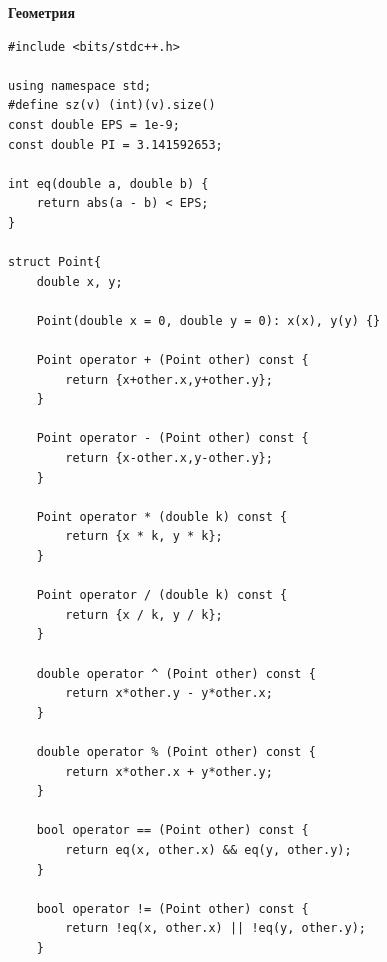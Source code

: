 \documentclass[a4paper, 10pt]{article}
\begin{document}
{\Large \textbf{Геометрия}}
\begin{lstlisting}
#include <bits/stdc++.h>

using namespace std;
#define sz(v) (int)(v).size()
const double EPS = 1e-9;
const double PI = 3.141592653;

int eq(double a, double b) {
    return abs(a - b) < EPS;
}

struct Point{
    double x, y;

    Point(double x = 0, double y = 0): x(x), y(y) {}

    Point operator + (Point other) const {
        return {x+other.x,y+other.y};
    }

    Point operator - (Point other) const {
        return {x-other.x,y-other.y};
    }

    Point operator * (double k) const {
        return {x * k, y * k};
    }

    Point operator / (double k) const {
        return {x / k, y / k};
    }

    double operator ^ (Point other) const {
        return x*other.y - y*other.x;
    }

    double operator % (Point other) const {
        return x*other.x + y*other.y;
    }

    bool operator == (Point other) const {
        return eq(x, other.x) && eq(y, other.y);
    }

    bool operator != (Point other) const {
        return !eq(x, other.x) || !eq(y, other.y);
    }


\end{lstlisting}
\end{document}
